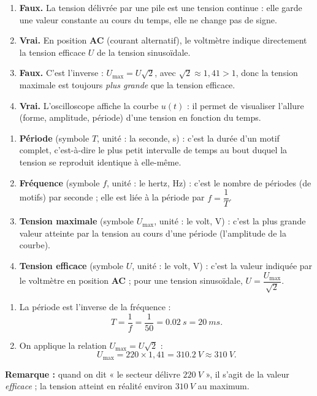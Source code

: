 \documentclass[11pt]{article}
\newcommand{\cle}[1]{{\popxbold\color{popdark}#1}}
\begin{document}
\begin{corrige}
\begin{enumerate}
\item \textbf{Faux.} La tension délivrée par une pile est une tension \cle{continue} : elle garde une valeur constante au cours du temps, elle ne change pas de signe.
\item \textbf{Vrai.} En position \textbf{AC} (courant alternatif), le voltmètre indique directement la \cle{tension efficace} $U$ de la tension sinusoïdale.
\item \textbf{Faux.} C'est l'inverse : $U_{\max} = U\sqrt{2}$, avec $\sqrt{2} \approx 1,41 > 1$, donc la tension maximale est toujours \emph{plus grande} que la tension efficace.
\item \textbf{Vrai.} L'oscilloscope affiche la courbe $u(t)$ : il permet de visualiser l'allure (forme, amplitude, période) d'une tension en fonction du temps.
\end{enumerate}
\end{corrige}

\begin{corrige}
\begin{enumerate}
\item \textbf{Période} (symbole $T$, unité : la seconde, s) : c'est la durée d'un motif complet, c'est-à-dire le plus petit intervalle de temps au bout duquel la tension se reproduit identique à elle-même.
\item \textbf{Fréquence} (symbole $f$, unité : le hertz, Hz) : c'est le nombre de périodes (de motifs) par seconde ; elle est liée à la période par $f = \dfrac{1}{T}$.
\item \textbf{Tension maximale} (symbole $U_{\max}$, unité : le volt, V) : c'est la plus grande valeur atteinte par la tension au cours d'une période (l'amplitude de la courbe).
\item \textbf{Tension efficace} (symbole $U$, unité : le volt, V) : c'est la valeur indiquée par le voltmètre en position \textbf{AC} ; pour une tension sinusoïdale, $U = \dfrac{U_{\max}}{\sqrt{2}}$.
\end{enumerate}
\end{corrige}

\begin{corrige}
\begin{enumerate}
\item La période est l'inverse de la fréquence :
\[ T = \frac{1}{f} = \frac{1}{50} = \SI{0,02}{s} = \SI{20}{ms}. \]
\item On applique la relation $U_{\max} = U\sqrt{2}$ :
\[ U_{\max} = 220 \times 1,41 = \SI{310,2}{V} \approx \SI{310}{V}. \]
\end{enumerate}
\textbf{Remarque :} quand on dit « le secteur délivre $\SI{220}{V}$ », il s'agit de la valeur \emph{efficace} ; la tension atteint en réalité environ $\SI{310}{V}$ au maximum.
\end{corrige}
\end{document}
